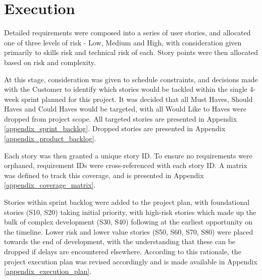 \section{Execution}\label{execution}

Detailed requirements were composed into a series of user stories, and allocated one of three levels of risk - Low, Medium and High, with consideration given primarily to skills risk and technical risk of each.
Story points were then allocated based on risk and complexity.

At this stage, consideration was given to schedule constraints, and decisions made with the Customer to identify which stories would be tackled within the single 4-week sprint planned for this project.
It was decided that all Must Haves, Should Haves and Could Haves would be targeted, with all Would Like to Haves were dropped from project scope.
All targeted stories are presented in Appendix \ref{appendix_sprint_backlog}. Dropped stories are presented in Appendix \ref{appendix_product_backlog}.

Each story was then granted a unique story ID. To ensure no requirements were orphaned, requirement IDs were cross-referenced with each story ID. 
A matrix was defined to track this coverage, and is presented in Appendix \ref{appendix_coverage_matrix}.

Stories within sprint backlog were added to the project plan, with foundational stories (S10, S20) taking initial priority, with high-risk stories which made up the bulk of complex development (S30, S40) following at the earliest opportunity on the timeline. 
Lower risk and lower value stories (S50, S60, S70, S80) were placed towards the end of development, with the understanding that these can be dropped if delays are encountered elsewhere. According to this rationale, the project execution plan was revised accordingly and is made available in Appendix \ref{appendix_execution_plan}.

